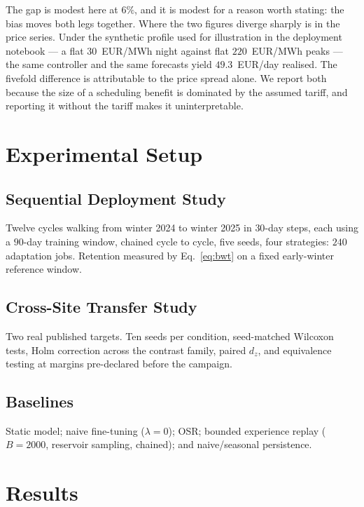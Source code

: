 \documentclass[journal]{IEEEtran}
\newcommand{\ewclambda}{\lambda}
\begin{document}
The gap is modest here at $6\%$, and it is modest for a reason worth stating:
the bias moves both legs together. Where the two figures diverge sharply is in
the price series. Under the synthetic profile used for illustration in the
deployment notebook --- a flat $30$~EUR/MWh night against flat $220$~EUR/MWh
peaks --- the same controller and the same forecasts yield $49.3$~EUR/day
realised. The fivefold difference is attributable to the price spread alone.
We report both because the size of a scheduling benefit is dominated by the
assumed tariff, and reporting it without the tariff makes it uninterpretable.

\section{Experimental Setup}
\label{sec:setup}

\subsection{Sequential Deployment Study}
Twelve cycles walking from winter 2024 to winter 2025 in $30$-day steps, each
using a $90$-day training window, chained cycle to cycle, five seeds, four
strategies: $240$ adaptation jobs. Retention measured by Eq.~\eqref{eq:bwt} on a
fixed early-winter reference window.

\subsection{Cross-Site Transfer Study}
Two real published targets. Ten seeds per condition, seed-matched Wilcoxon
tests, Holm correction across the contrast family, paired $d_z$, and equivalence
testing at margins pre-declared before the campaign.

\subsection{Baselines}
Static model; naive fine-tuning ($\ewclambda{=}0$); OSR; bounded experience
replay ($B{=}2000$, reservoir sampling, chained); and naive/seasonal persistence.

\section{Results}
\label{sec:results}
\end{document}
